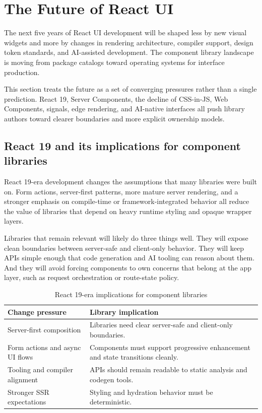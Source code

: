 \clearpage
\section{The Future of React UI}

The next five years of React UI development will be shaped less by new visual widgets and more by changes in rendering architecture, compiler support, design token standards, and AI-assisted development. The component library landscape is moving from package catalogs toward operating systems for interface production.

This section treats the future as a set of converging pressures rather than a single prediction. React 19, Server Components, the decline of CSS-in-JS, Web Components, signals, edge rendering, and AI-native interfaces all push library authors toward clearer boundaries and more explicit ownership models.

\subsection{React 19 and its implications for component libraries}
React 19-era development changes the assumptions that many libraries were built on. Form actions, server-first patterns, more mature server rendering, and a stronger emphasis on compile-time or framework-integrated behavior all reduce the value of libraries that depend on heavy runtime styling and opaque wrapper layers.

Libraries that remain relevant will likely do three things well. They will expose clean boundaries between server-safe and client-only behavior. They will keep APIs simple enough that code generation and AI tooling can reason about them. And they will avoid forcing components to own concerns that belong at the app layer, such as request orchestration or route-state policy.

\begin{table}[htbp]
  \centering
  \caption{React 19-era implications for component libraries}
  \begin{tabularx}{\textwidth}{@{}p{}Y@{}}
    \toprule
    \textbf{Change pressure} & \textbf{Library implication} \\
    \midrule
    Server-first composition & Libraries need clear server-safe and client-only boundaries. \\
    Form actions and async UI flows & Components must support progressive enhancement and state transitions cleanly. \\
    Tooling and compiler alignment & APIs should remain readable to static analysis and codegen tools. \\
    Stronger SSR expectations & Styling and hydration behavior must be deterministic. \\
    \bottomrule
  \end{tabularx}
\end{table}

